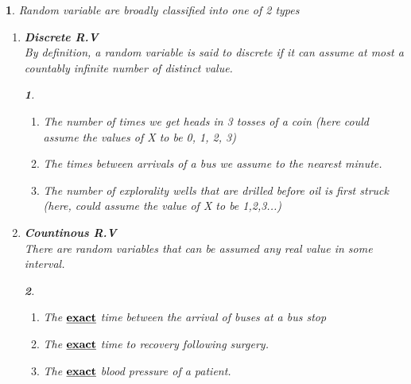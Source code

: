 \documentclass[11pt]{article}
\newtheorem{definition}{\framebox{DEF}}[section]
\newtheorem{example}{\framebox{Ex}}[section]
\newcommand\tab[1][1cm]{\hspace*{#1}}
\begin{document}
            \begin{definition}
                Random variable are broadly classified into one of 2 types
                \begin{enumerate}
                    \item \textbf{Discrete R.V} \\
                            By definition, a random variable is said to discrete if it can assume at most a countably infinite number of distinct value.
                            \begin{example}\tab
                                \begin{enumerate}
                                    \item The number of times we get heads in 3 tosses of a coin (here could assume the values of X to be 0, 1, 2, 3)
                                    \item The times between arrivals of a bus we assume to the nearest minute.
                                    \item The number of explorality  wells that are drilled before oil is first struck (here, could assume the value of X to be 1,2,3...)
                                \end{enumerate}
                            \end{example}
                    \item \textbf{Countinous R.V} \\
                            There are random variables that can be assumed any real value in some interval. 
                            \begin{example}\tab
                                \begin{enumerate}
                                    \item The $\textbf{\underline{exact}}$ time between the arrival of buses at a bus stop
                                    \item The $\textbf{\underline{exact}}$ time to recovery following surgery.
                                    \item The $\textbf{\underline{exact}}$ blood pressure of a patient.
                                \end{enumerate}
                            \end{example}
                \end{enumerate}
            \end{definition}
\end{document}
